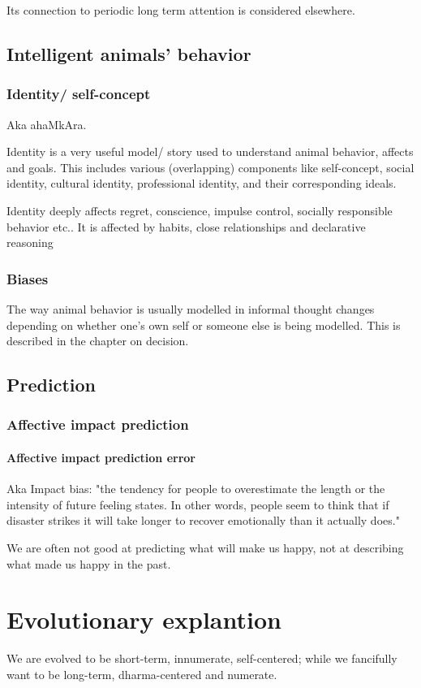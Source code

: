 \documentclass[oneside, article]{memoir}
\begin{document}
Its connection to periodic long term attention is considered elsewhere.

\section{Intelligent animals' behavior}
\subsection{Identity/ self-concept}
Aka ahaMkAra. 

Identity is a very useful model/ story used to understand animal behavior, affects and goals. This includes various (overlapping) components like self-concept, social identity, cultural identity, professional identity, and their corresponding ideals.

Identity deeply affects regret, conscience, impulse control, socially responsible behavior etc.. It is affected by habits, close relationships and declarative reasoning

\subsection{Biases}
The way animal behavior is usually modelled in informal thought changes depending on whether one's own self or someone else is being modelled. This is described in the chapter on decision.

\section{Prediction}
\subsection{Affective impact prediction}
\subsubsection{Affective impact prediction error}
Aka Impact bias: "the tendency for people to overestimate the length or the intensity of future feeling states. In other words, people seem to think that if disaster strikes it will take longer to recover emotionally than it actually does."

We are often not good at predicting what will make us happy, not at describing what made us happy in the past. 

\chapter{Evolutionary explantion}
We are evolved to be short-term, innumerate, self-centered; while we fancifully want to be long-term, dharma-centered and numerate.
\end{document}

